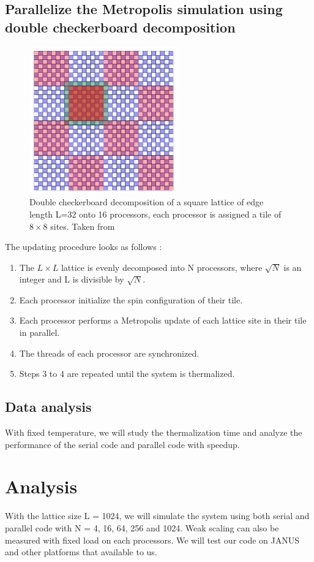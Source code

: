\documentclass[runningheads]{llncs}
\begin{document}
\subsection{Parallelize the Metropolis simulation using double checkerboard decomposition}
\begin{figure}
\begin{center}
\includegraphics[width=2.5in]{./checkerboard.png}
\caption[]{ Double checkerboard decomposition of a square lattice of edge length L=32 onto 16 processors, each processor is assigned a tile of $8 \times 8$ sites. Taken from \cite{Weigel}}
\label{sample-figure}
\end{center}
\end{figure}
The updating procedure looks as follows \cite{Weigel}:
\begin{enumerate}
\item The $L \times L$ lattice is evenly decomposed into N processors, where $\sqrt{N}$ is an integer and L is divisible by $\sqrt{N}$. 
\item Each processor initialize the spin configuration of their tile.
\item Each processor performs a Metropolis update of each lattice site in their tile in parallel.
\item The threads of each processor are synchronized.
\item Steps 3 to 4 are repeated until the system is thermalized.
\end{enumerate}

\subsection{Data analysis}
With fixed temperature,  we will study  the thermalization time and analyze the performance of the serial code and parallel code with speedup.

\section{Analysis}
With the lattice size L = 1024, we will simulate the system using both serial and parallel code with N = 4, 16, 64, 256 and 1024. Weak scaling can also be measured with fixed load on each processors. We will test our code on JANUS and other platforms that available to us.
\end{document}
